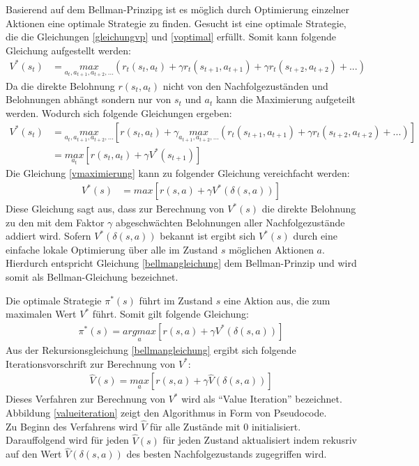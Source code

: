 \documentclass[10pt]{scrartcl}
\begin{document}
Basierend auf dem Bellman-Prinzipg ist es möglich durch Optimierung einzelner Aktionen eine optimale Strategie zu finden. Gesucht ist eine optimale Strategie, die die Gleichungen \ref{gleichungvp} und \ref{voptimal} erfüllt. Somit kann folgende Gleichung aufgestellt werden:
\begin{align}
V^*(s_t) &= \underset{a_t,a_{t+1}, a_{t+2},...}{max}(r_t(s_t,a_t) + \gamma r_t(s_{t+1},a_{t+1}) + \gamma r_t(s_{t+2},a_{t+2}) + ...)
\end{align}
Da die direkte Belohnung $r(s_t, a_t)$ nicht von den Nachfolgezuständen und Belohnungen abhängt sondern nur  von $s_t$ und $a_t$ kann die Maximierung aufgeteilt werden. Wodurch sich folgende Gleichungen ergeben:
\begin{align}
V^*(s_t) &= \underset{a_t,a_{t+1}, a_{t+2},...}{max}[r(s_t, a_t) + \gamma \underset{a_{t+1},a_{t+2},...}{max}(r_t(s_{t+1},a_{t+1}) + \gamma r_t(s_{t+2},a_{t+2}) + ...)]\\
&= \underset{a_t}{max}[r(s_t, a_t)+\gamma V^*(s_{t+1})]\label{vmaximierung}
\end{align}
Die Gleichung \ref{vmaximierung} kann zu folgender Gleichung  vereichfacht werden:
\begin{align}\label{bellmangleichung}
V^*(s) &= max[r(s,a) + \gamma V^*(\delta(s,a))]
\end{align}
Diese Gleichung sagt aus, dass zur Berechnung von $V^*(s)$ die direkte Belohnung zu den mit dem Faktor $\gamma$ abgeschwächten Belohnungen aller Nachfolgezustände addiert wird. Sofern $V^*(\delta(s,a))$ bekannt ist ergibt sich $V^*(s)$ durch eine einfache lokale Optimierung über alle im Zustand $s$ möglichen Aktionen $a$. Hierdurch entspricht Gleichung \ref{bellmangleichung} dem Bellman-Prinzip und wird somit als Bellman-Gleichung bezeichnet.

Die optimale Strategie $\pi^*(s)$ führt im Zustand $s$ eine Aktion aus, die zum maximalen Wert $V^*$ führt. Somit gilt folgende Gleichung:
\begin{align}
\pi^*(s) = \underset{a}{argmax}[r(s,a) + \gamma V^*(\delta(s,a))]
\end{align}
Aus der Rekursionsgleichung \ref{bellmangleichung} ergibt sich folgende Iterationsvorschrift zur Berechnung von $V^*$:
\begin{align}
\widehat{V}(s) = \underset{a}{max}[r(s,a) + \gamma \widehat{V}(\delta(s,a))]
\end{align}
Dieses Verfahren zur Berechnung von $V^*$ wird als ``Value Iteration'' bezeichnet. 
Abbildung \ref{valueiteration} zeigt den Algorithmus in Form von Pseudocode.\\
Zu Beginn des Verfahrens wird $\widehat{V}$ für alle Zustände mit $0$ initialisiert. Darauffolgend wird für jeden $\widehat{V}(s)$ für jeden Zustand aktualisiert indem rekusriv auf den Wert $\widehat{V}(\delta(s,a))$ des besten Nachfolgezustands zugegriffen wird.
\end{document}
